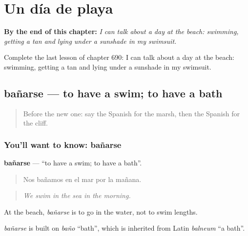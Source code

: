 
\chapter{Un día de playa}
\label{ch:es-un-dia-de-playa}

\begin{chapteropening}
\textbf{By the end of this chapter:} \emph{I can talk about a day at the beach: swimming, getting a tan and lying under a sunshade in my swimsuit.}

Complete the last lesson of chapter 690: I can talk about a day at the beach: swimming, getting a tan and lying under a sunshade in my swimsuit.
\end{chapteropening}

\section[bañarse]{bañarse — to have a swim; to have a bath}

\label{lesson:ES-C690-banarse}



\begin{quote}
Before the new one: say the Spanish for the marsh, then the Spanish for the cliff.
\end{quote}

\subsection*{You'll want to know: bañarse}
\textbf{bañarse} — \textquotedblleft{}to have a swim; to have a bath\textquotedblright{}.

\begin{quote}
Nos bañamos en el mar por la mañana.
\end{quote}

\begin{quote}
\emph{We swim in the sea in the morning.}
\end{quote}

At the beach, \emph{bañarse} is to go in the water, not to swim lengths.

\begin{cousinweb}
\emph{bañarse} is built on \emph{baño} \textquotedblleft{}bath\textquotedblright{}, which is inherited from Latin \emph{balneum} \textquotedblleft{}a bath\textquotedblright{}.
\end{cousinweb}

